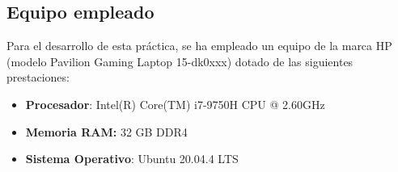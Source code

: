 \subsection{Equipo empleado}

Para el desarrollo de esta práctica, se ha empleado un equipo de la marca HP (modelo Pavilion Gaming Laptop 15-dk0xxx) 
dotado de las siguientes prestaciones: 

\begin{itemize}
    \item \textbf{Procesador}: Intel(R) Core(TM) i7-9750H CPU @ 2.60GHz
    \item \textbf{Memoria RAM:} 32 GB DDR4
    \item \textbf{Sistema Operativo}: Ubuntu 20.04.4 LTS
\end{itemize}